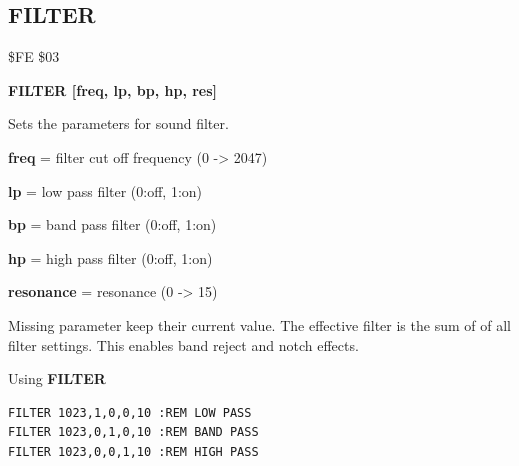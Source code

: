 
\newpage
\subsection{FILTER}
\begin{description}[leftmargin=2cm,style=nextline]
\item [Token:] \$FE \$03
\item [Format:] {\bf FILTER [freq, lp, bp, hp, res]}
\item [Usage:] Sets
               the parameters for sound filter.

      {\bf freq} = filter cut off frequency (0 -> 2047)

      {\bf lp} = low pass filter (0:off, 1:on)

      {\bf bp} = band pass filter (0:off, 1:on)

      {\bf hp} = high pass filter (0:off, 1:on)

      {\bf resonance} = resonance (0 -> 15)

\item [Remarks:] Missing parameter keep their current value.
                 The effective filter is the sum of
                 of all filter settings.
                 This enables band reject and notch effects.

\item [Example:]
                Using {\bf FILTER}
\begin{tcolorbox}[colback=black,coltext=white]
\verbatimfont{\codefont}
\begin{verbatim}
FILTER 1023,1,0,0,10 :REM LOW PASS
FILTER 1023,0,1,0,10 :REM BAND PASS
FILTER 1023,0,0,1,10 :REM HIGH PASS
\end{verbatim}
\end{tcolorbox}
\end{description}


\newpage
